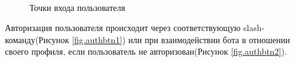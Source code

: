 \begin{figure}
    \centering
    \\
    \caption{Точки входа пользователя}
\end{figure}

Авторизация пользователя происходит через соответствующую slash-команду(Рисунок {\color{blue} \ref{fig.authbtn1}}) или при взаимодействии бота в отношении своего профиля, если пользователь не авторизован(Рисунок {\color{blue} \ref{fig.authbtn2}}).

